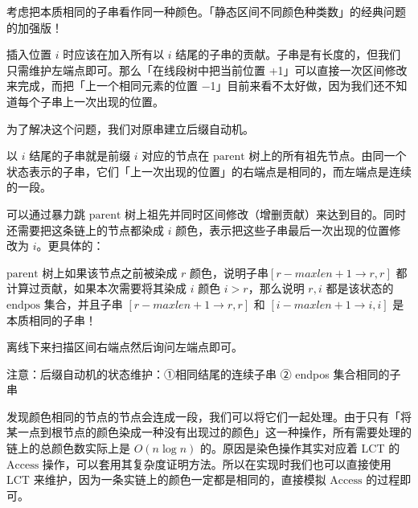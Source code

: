 \par \noindent 考虑把本质相同的子串看作同一种颜色。「静态区间不同颜色种类数」的经典问题的加强版！
~\\
\par \noindent 插入位置 $i$ 时应该在加入所有以 $i$ 结尾的子串的贡献。子串是有长度的，但我们只需维护左端点即可。那么「在线段树中把当前位置 +1」可以直接一次区间修改来完成，而把「上一个相同元素的位置 −1」目前来看不太好做，因为我们还不知道每个子串上一次出现的位置。
~\\
\par \noindent 为了解决这个问题，我们对原串建立后缀自动机。
~\\
\par \noindent 以 $i$ 结尾的子串就是前缀 $i$ 对应的节点在 $\text{parent}$ 树上的所有祖先节点。由同一个状态表示的子串，它们「上一次出现的位置」的右端点是相同的，而左端点是连续的一段。
~\\
\par \noindent 可以通过暴力跳 $\text{parent}$ 树上祖先并同时区间修改（增删贡献）来达到目的。同时还需要把这条链上的节点都染成 $i$ 颜色，表示把这些子串最后一次出现的位置修改为 $i$。更具体的：
~\\
\par \noindent $\text{parent}$ 树上如果该节点之前被染成 $r$ 颜色，说明子串$[r-maxlen+1\to r,   r]$ 都计算过贡献，如果本次需要将其染成 $i$ 颜色 $i > r$，那么说明 $r, i$ 都是该状态的 $\text{endpos}$ 集合，并且子串 $[r-maxlen+1\to r,   r]$ 和 $[i-maxlen+1\to i,   i]$ 是本质相同的子串！
~\\
\par \noindent 离线下来扫描区间右端点然后询问左端点即可。
~\\
\par \noindent 注意：后缀自动机的状态维护：①相同结尾的连续子串 ② endpos 集合相同的子串
~\\
\par \noindent 发现颜色相同的节点的节点会连成一段，我们可以将它们一起处理。由于只有「将某一点到根节点的颜色染成一种没有出现过的颜色」这一种操作，所有需要处理的链上的总颜色数实际上是 $O(n\log n)$ 的。原因是染色操作其实对应着 LCT 的 $\text{Access}$ 操作，可以套用其复杂度证明方法。所以在实现时我们也可以直接使用 LCT 来维护，因为一条实链上的颜色一定都是相同的，直接模拟 $\text{Access}$ 的过程即可。

